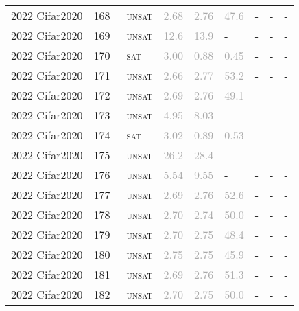 \begin{center}
{\begin{longtable}{@{}lllllllll@{}}
2022 Cifar2020 & 168 & ~\textsc{unsat} & \textcolor{darkgray}{2.68} & \textcolor{darkgray}{2.76} & \textcolor{darkgray}{47.6} & - & - & - \\
2022 Cifar2020 & 169 & ~\textsc{unsat} & \textcolor{darkgray}{12.6} & \textcolor{darkgray}{13.9} & - & - & - & - \\
2022 Cifar2020 & 170 & ~\textsc{sat} & \textcolor{darkgray}{3.00} & \textcolor{darkgray}{0.88} & \textcolor{darkgray}{0.45} & - & - & - \\
2022 Cifar2020 & 171 & ~\textsc{unsat} & \textcolor{darkgray}{2.66} & \textcolor{darkgray}{2.77} & \textcolor{darkgray}{53.2} & - & - & - \\
2022 Cifar2020 & 172 & ~\textsc{unsat} & \textcolor{darkgray}{2.69} & \textcolor{darkgray}{2.76} & \textcolor{darkgray}{49.1} & - & - & - \\
2022 Cifar2020 & 173 & ~\textsc{unsat} & \textcolor{darkgray}{4.95} & \textcolor{darkgray}{8.03} & - & - & - & - \\
2022 Cifar2020 & 174 & ~\textsc{sat} & \textcolor{darkgray}{3.02} & \textcolor{darkgray}{0.89} & \textcolor{darkgray}{0.53} & - & - & - \\
2022 Cifar2020 & 175 & ~\textsc{unsat} & \textcolor{darkgray}{26.2} & \textcolor{darkgray}{28.4} & - & - & - & - \\
2022 Cifar2020 & 176 & ~\textsc{unsat} & \textcolor{darkgray}{5.54} & \textcolor{darkgray}{9.55} & - & - & - & - \\
2022 Cifar2020 & 177 & ~\textsc{unsat} & \textcolor{darkgray}{2.69} & \textcolor{darkgray}{2.76} & \textcolor{darkgray}{52.6} & - & - & - \\
2022 Cifar2020 & 178 & ~\textsc{unsat} & \textcolor{darkgray}{2.70} & \textcolor{darkgray}{2.74} & \textcolor{darkgray}{50.0} & - & - & - \\
2022 Cifar2020 & 179 & ~\textsc{unsat} & \textcolor{darkgray}{2.70} & \textcolor{darkgray}{2.75} & \textcolor{darkgray}{48.4} & - & - & - \\
2022 Cifar2020 & 180 & ~\textsc{unsat} & \textcolor{darkgray}{2.75} & \textcolor{darkgray}{2.75} & \textcolor{darkgray}{45.9} & - & - & - \\
2022 Cifar2020 & 181 & ~\textsc{unsat} & \textcolor{darkgray}{2.69} & \textcolor{darkgray}{2.76} & \textcolor{darkgray}{51.3} & - & - & - \\
2022 Cifar2020 & 182 & ~\textsc{unsat} & \textcolor{darkgray}{2.70} & \textcolor{darkgray}{2.75} & \textcolor{darkgray}{50.0} & - & - & - \\

\end{longtable}}
\end{center}
